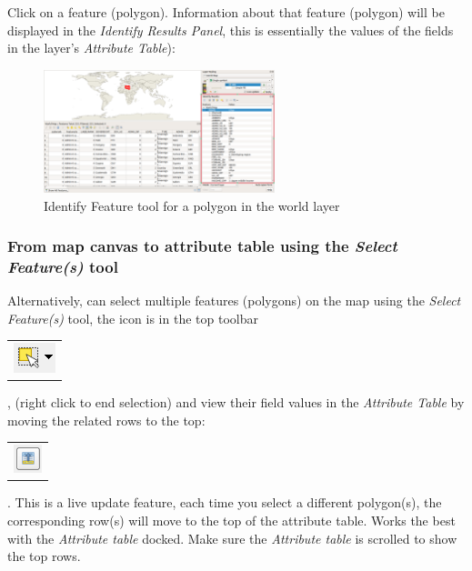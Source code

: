 Click on a feature (polygon). Information about that feature (polygon) will be displayed in the \textit{Identify Results Panel}, this is essentially the values of the fields in the layer's \textit{Attribute Table}):  

\begin{figure}[!h]
	\centering
	\includegraphics[width=0.6\textwidth]{images/world_identify_feature.png}%
	\caption{Identify Feature tool for a polygon in the world layer}
	\label{ft_fig_firstfig3}
\end{figure}

\subsubsection{From map canvas to attribute table using the \textit{Select Feature(s)} tool}

Alternatively, can select multiple features (polygons) on the map using the \textit{Select Feature(s)} tool, the icon is in the top toolbar
\begin{tabular}{@{}c@{}}\includegraphics[width=4ex]{images/select_features_by_polygon_icon.png}\end{tabular}
, (right click to end selection) and view their field values in the \textit{Attribute Table} by moving the related rows to the top:
\begin{tabular}{@{}c@{}}\includegraphics[width=4ex]{images/move_selection_to_top_icon.png}\end{tabular}. This is a live update feature, each time you select a different polygon(s), the corresponding row(s) will move to the top of the attribute table. Works the best with the \textit{Attribute table} docked. Make sure the \textit{Attribute table} is scrolled to show the top rows.\\

